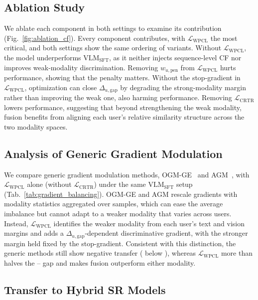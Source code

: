 \subsection{Ablation Study}
We ablate each component in both settings to examine its contribution (Fig.~\ref{fig:ablation_cf}).
Every component contributes, with $\mathcal{L}_{\text{WPCL}}$ the most critical, and both settings show the same ordering of variants.
Without $\mathcal{L}_{\text{WPCL}}$, the model underperforms $\text{VLM}_{\text{SFT}}$, as it neither injects sequence-level CF nor improves weak-modality discrimination.
Removing $w_{u,\text{pen}}$ from $\mathcal{L}_{\text{WPCL}}$ hurts performance, showing that the penalty matters.
Without the stop-gradient in $\mathcal{L}_{\text{WPCL}}$, optimization can close $\Delta_{u,\mathrm{gap}}$ by degrading the strong-modality margin rather than improving the weak one, also harming performance.
Removing $\mathcal{L}_{\text{CRTR}}$ lowers performance, suggesting that beyond strengthening the weak modality, fusion benefits from aligning each user's relative similarity structure across the two modality spaces.


\subsection{Analysis of Generic Gradient Modulation}
\label{sec:gradient_balancing}
We compare generic gradient modulation methods, OGM-GE~\cite{modality_balancing_OGM-GE_1} and AGM~\cite{modality_balancing_AGM_2}, with $\mathcal{L}_{\text{WPCL}}$ alone (without $\mathcal{L}_{\text{CRTR}}$) under the same $\text{VLM}_{\text{SFT}}$ setup (Tab.~\ref{tab:gradient_balancing}).
OGM-GE and AGM rescale gradients with modality statistics aggregated over samples, which can ease the average imbalance but cannot adapt to a weaker modality that varies across users.
Instead, $\mathcal{L}_{\text{WPCL}}$ identifies the weaker modality from each user's text and vision margins and adds a $\Delta_{u,\mathrm{gap}}$-dependent discriminative gradient, with the stronger margin held fixed by the stop-gradient.
Consistent with this distinction, the generic methods still show negative transfer (\FUSIONset{} below \TEXTset{}), whereas $\mathcal{L}_{\text{WPCL}}$ more than halves the \TEXTset{}--\VISIONset{} gap and makes fusion outperform either modality.




\subsection{Transfer to Hybrid SR Models}
\label{sec:exp_hybrid_backbones}

